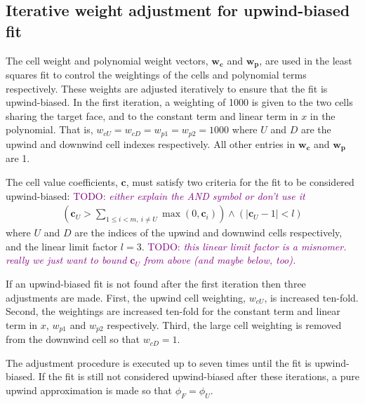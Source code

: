 \documentclass{article}
\newcommand{\TODO}[1]{\textcolor{purple}{TODO: \emph{#1}}}
\begin{document}
\subsection{Iterative weight adjustment for upwind-biased fit}
The cell weight and polynomial weight vectors, $\mathbf{w_c}$ and $\mathbf{w_p}$, are used in the least squares fit to control the weightings of the cells and polynomial terms respectively.  These weights are adjusted iteratively to ensure that the fit is upwind-biased.
In the first iteration, a weighting of 1000 is given to the two cells sharing the target face, and to the constant term and linear term in $x$ in the polynomial.  That is, $w_{cU} = w_{cD} = w_{p1} = w_{p2} = 1000$ where $U$ and $D$ are the upwind and downwind cell indexes respectively.  All other entries in $\mathbf{w_c}$ and $\mathbf{w_p}$ are 1.

The cell value coefficients, $\mathbf{c}$, must satisfy two criteria for the fit to be considered upwind-biased: \TODO{either explain the AND symbol or don't use it}
\begin{align}
	\left(\mathbf{c}_U > \sum_{1 \leq i < m, \:i \neq U} \max(0, \mathbf{c}_i)\right) \land
	\left(|\mathbf{c}_U - 1| < l\right)
\end{align}
where $U$ and $D$ are the indices of the upwind and downwind cells respectively, and the linear limit factor $l = 3$.  \TODO{this linear limit factor is a misnomer.  really we just want to bound $\mathbf{c}_U$ from above (and maybe below, too).}

If an upwind-biased fit is not found after the first iteration then three adjustments are made.  First, the upwind cell weighting, $w_{cU}$, is increased ten-fold.  Second, the weightings are increased ten-fold for the constant term and linear term in $x$, $w_{p1}$ and $w_{p2}$ respectively.  Third, the large cell weighting is removed from the downwind cell so that $w_{cD} = 1$.

The adjustment procedure is executed up to seven times until the fit is upwind-biased.  If the fit is still not considered upwind-biased after these iterations, a pure upwind approximation is made so that $\phi_F = \phi_U$.
\end{document}
